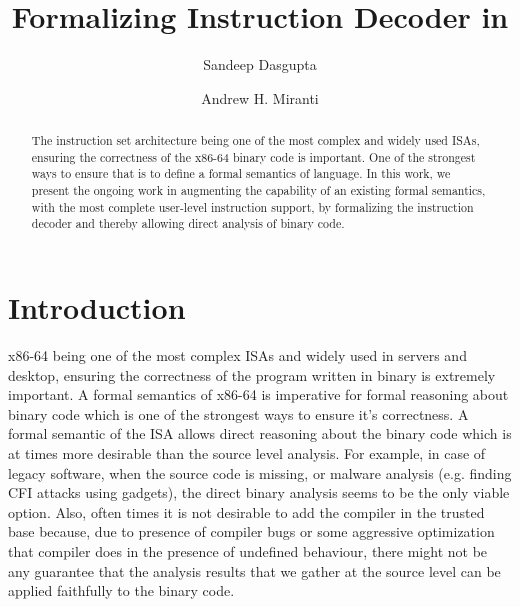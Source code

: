 \documentclass[a4paper,UKenglish,cleveref, autoref]{lipics-v2019}
\title{Formalizing \ISA Instruction Decoder in \K} %
\author{Sandeep Dasgupta}{University of Illinois at Urbana Champaign, USA \and \url{http://sdasgup3.web.engr.illinois.edu} }{sdasgup3@illinois.edu}{}{}
\author{Andrew H. Miranti}{University of Illinois at Urbana Champaign, USA}{miranti2@illinois.edu}{}{}
\begin{document}
\maketitle

\begin{abstract}
    The \ISA instruction set architecture being one of the
    most complex and widely used ISAs,  ensuring the correctness of the x86-64 binary code is
    important. One of the strongest ways to ensure that is to define a  formal semantics of \ISA language.
    In this work, we present the ongoing work in augmenting the capability of an existing \ISA formal semantics, with the most complete user-level instruction support, by formalizing the instruction decoder and thereby allowing direct analysis of binary code.
\end{abstract}

\section{Introduction}
\label{sec:intro}
x86-64 being one of the most complex ISAs and widely used in servers and desktop, ensuring the correctness of the program written in binary is extremely important. A formal semantics of x86-64 is imperative for formal reasoning about binary code which is  one of the strongest ways to ensure it's correctness. A formal semantic of the ISA allows direct reasoning about the binary code which is at times more desirable than the source level analysis. For example, in case of legacy software, when the source code is missing, or malware analysis (e.g. finding CFI attacks using gadgets), the direct binary analysis seems to be the only viable option.  Also, often times it is not desirable to add the compiler in the trusted base because, due to presence of compiler bugs or some aggressive optimization that compiler does in the presence of undefined behaviour, there might not be any guarantee that the analysis results that we gather at the source level  can be applied faithfully to the binary code.  
\end{document}
